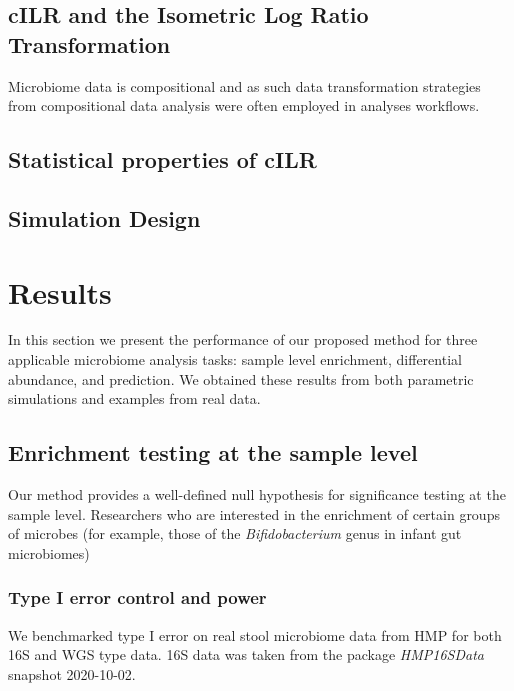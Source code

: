 \documentclass{article}
\begin{document}
\subsection*{cILR and the Isometric Log Ratio Transformation}
Microbiome data is compositional \cite{gloor2017} and as such data transformation strategies from compositional data analysis \cite{aitchison} were often employed in analyses workflows.  

\subsection*{Statistical properties of cILR}

\subsection*{Simulation Design}

\section*{Results}
In this section we present the performance of our proposed method for three applicable microbiome analysis tasks: sample level enrichment, differential abundance, and prediction. We obtained these results from both parametric simulations and examples from real data.  
\subsection*{Enrichment testing at the sample level}
Our method provides a well-defined null hypothesis for significance testing at the sample level. Researchers who are interested in the enrichment of certain groups of microbes (for example, those of the \emph{Bifidobacterium} genus in infant gut microbiomes)  
\subsubsection*{Type I error control and power}
We benchmarked type I error on real stool microbiome data from HMP for both 16S and WGS type data. 16S data was taken from the package \emph{HMP16SData} snapshot 2020-10-02. 
\end{document}
